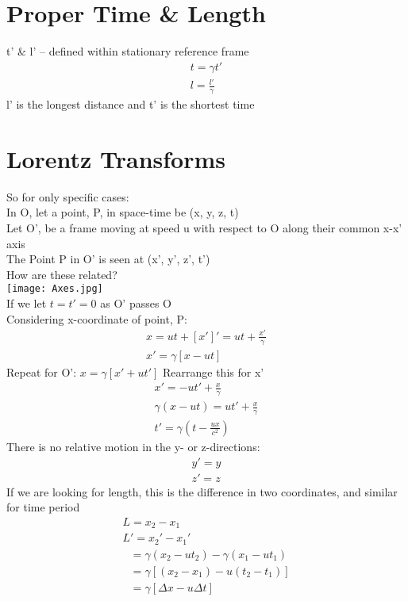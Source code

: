 \documentclass[a4paper, 11pt, fleqn, normalem]{report}
\begin{document}
\section{Proper Time \& Length}
t' \& l' -- defined within stationary reference frame
\begin{gather*}
    t = \gamma t' \\
    l = \frac{l'}{\gamma}
\end{gather*}
l' is the longest distance and t' is the shortest time

\section{Lorentz Transforms}
So for only specific cases: \\
In O, let a point, P, in space-time be (x, y, z, t) \\
Let O', be a frame moving at speed u with respect to O along their common x-x' axis \\
The Point P in O' is seen at (x', y', z', t') \\
How are these related? \\
\texttt{[image: Axes.jpg]} \\
If we let $t = t' = 0$ as O' passes O \\
Considering x-coordinate of point, P:
\begin{gather*}
    x = ut + [x']' = ut + \frac{x'}{\gamma} \\
    x' = \gamma [x - ut]
\end{gather*}
Repeat for O': $x = \gamma [x' + ut']$
Rearrange this for x'
\begin{gather*}
    x' = -ut' + \frac{x}{\gamma} \\
    \gamma(x - ut) = ut' + \frac{x}{\gamma} \\
    t' = \gamma(t - \frac{ux}{c^{2}})
\end{gather*}
There is no relative motion in the y- or z-directions:
\begin{gather*}
    y' = y \\
    z' = z
\end{gather*}
If we are looking for length, this is the difference in two coordinates, and similar for time period
\begin{gather*}
    L = x_{2} - x_{1} \\
    L' = x_{2}' - x_{1}' \\
    ~~~ = \gamma(x_{2} - ut_{2}) - \gamma(x_{1} - ut_{1}) \\
    ~~~ = \gamma[(x_{2} - x_{1}) - u(t_{2} - t_{1})] \\
    ~~~ = \gamma[\Delta x - u\Delta t]
\end{gather*}
\end{document}
